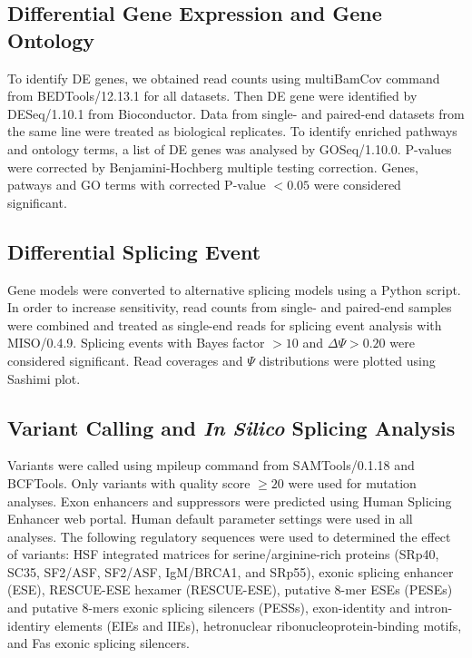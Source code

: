 \documentclass[10pt]{article}
\begin{document}
\subsection{Differential Gene Expression and Gene Ontology}

To identify DE genes, we obtained read counts using multiBamCov command from BEDTools/12.13.1\cite{}
for all datasets.
Then DE gene were identified by DESeq/1.10.1\cite{S:2010fu} from Bioconductor.
Data from single- and paired-end datasets from the same line were treated as biological replicates.
To identify enriched pathways and ontology terms, a list of DE genes was analysed by GOSeq/1.10.0\cite{}.
P-values were corrected by Benjamini-Hochberg multiple testing correction.
Genes, patways and GO terms with corrected P-value $<0.05$ were considered significant.

\subsection{Differential Splicing Event}
Gene models were converted to alternative splicing models using a Python script.
In order to increase sensitivity, read counts from single- and paired-end samples were combined and treated
as single-end reads for splicing event analysis with MISO/0.4.9\cite{Katz:2010iv}.
Splicing events with Bayes factor $>10$ and $\Delta\Psi>0.20$ were considered significant.
Read coverages and $\Psi$ distributions were plotted using Sashimi plot\cite{Katz:2013vx}.

\subsection{Variant Calling and \emph{In Silico} Splicing Analysis}
Variants were called using mpileup command from SAMTools/0.1.18\cite{} and BCFTools\cite{}.
Only variants with quality score $\ge20$ were used for mutation analyses.
Exon enhancers and suppressors were predicted using Human Splicing Enhancer web portal\cite{}.
Human default parameter settings were used in all analyses.
The following regulatory sequences were used to determined the effect of variants:
HSF integrated matrices for serine/arginine-rich proteins (SRp40, SC35, SF2/ASF, SF2/ASF,
IgM/BRCA1, and SRp55), exonic splicing enhancer (ESE), RESCUE-ESE hexamer (RESCUE-ESE),
putative 8-mer ESEs (PESEs) and putative 8-mers exonic splicing silencers (PESSs),
exon-identity and intron-identiry elements (EIEs and IIEs), hetronuclear ribonucleoprotein-binding
motifs, and Fas exonic splicing silencers.
\end{document}

